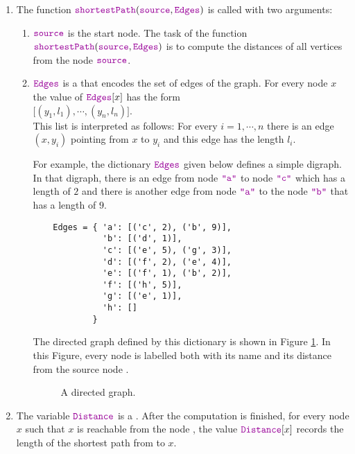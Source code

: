 \noindent
\begin{enumerate}
\item The function $\mytt{shortestPath}(\mytt{source}, \mytt{Edges})$ is called with two arguments:
      \begin{enumerate}
      \item $\mytt{source}$ is the start node.  The task of the function
            $\mytt{shortestPath}(\mytt{source}, \mytt{Edges})$ is to compute the distances of all 
            vertices from the node $\mytt{source}$.
      \item $\mytt{Edges}$ is a  that encodes the set of edges of the graph.  For
            every node $x$ the value of $\mytt{Edges}[x]$ has the form
            \\[0.2cm]
            \hspace*{1.3cm}
            $\bigl[ (y_1, l_1), \cdots, (y_n, l_n) \bigr]$.
            \\[0.2cm]
            This list is interpreted as follows: For every $i = 1,\cdots,n$ there is an edge
            $(x, y_i)$ pointing from $x$ to $y_i$ and this edge has the length $l_i$.

            For example, the dictionary $\mytt{Edges}$ given below defines a simple digraph.
            In that digraph, there is an edge from node $\mytt{"a"}$ to node $\mytt{"c"}$ which has a
            length of $2$ and there is another edge from node $\mytt{"a"}$ to the node $\mytt{"b"}$ that has a length of $9$.
            \begin{verbatim}
    Edges = { 'a': [('c', 2), ('b', 9)], 
              'b': [('d', 1)],
              'c': [('e', 5), ('g', 3)],  
              'd': [('f', 2), ('e', 4)],  
              'e': [('f', 1), ('b', 2)],
              'f': [('h', 5)],
              'g': [('e', 1)],
              'h': []
            }
            \end{verbatim}
      
      The directed graph defined by this dictionary is shown in Figure \ref{fig:directed-graph.pdf}.
      In this Figure, every node is labelled both with its name and its distance from the source node .
      \begin{figure}[!ht]
        \centering
        \caption{A directed graph.}
        \label{fig:directed-graph.pdf}
      \end{figure}
      \end{enumerate}
\item The variable $\mytt{Distance}$ is a .  After the computation is
      finished, for every node $x$ such that $x$ is reachable from the node ,
      the value $\mytt{Distance}[x]$ records the length of the shortest path from  to $x$.


\end{enumerate}
